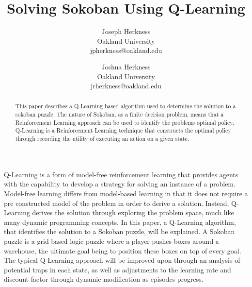 \documentclass[times, 10pt,twocolumn]{article}
\begin{document}
\title{Solving Sokoban Using Q-Learning}

\author{Joseph Herkness\\
Oakland University\\
jpherkness@oakland.edu\\
\and
Joshua Herkness\\
Oakland University\\
jrherkness@oakland.edu\\
}

\maketitle
\thispagestyle{empty}

\begin{abstract}
   This paper describes a Q-Learning based algorithm used to determine the solution to a sokoban puzzle. The nature of Sokoban, as a finite decision problem, means that a Reinforcement Learning approach can be used to identify the problems optimal policy. Q-Learning is a Reinforcement Learning technique that constructs the optimal policy through recording the utility of executing an action on a given state. 
\end{abstract}



Q-Learning is a form of model-free reinforcement learning that provides agents with the capability to develop a strategy for solving an instance of a problem. Model-free learning differs from model-based learning in that it does not require a pre constructed model of the problem in order to derive a solution. Instead, Q-Learning derives the solution through exploring the problem space, much like many dynamic programming concepts. In this paper, a Q-Learning algorithm, that identifies the solution to a Sokoban puzzle, will be explained. A Sokoban puzzle is a grid based logic puzzle where a player pushes boxes around a warehouse, the ultimate goal being to position these boxes on top of every goal. The typical Q-Learning approach will be improved upon through an analysis of potential traps in each state, as well as adjustments to the learning rate and discount factor through dynamic modification as episodes progress. 
\end{document}
